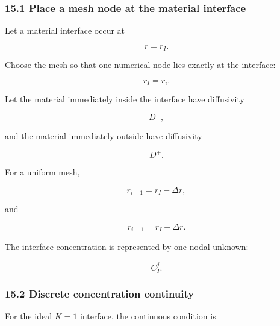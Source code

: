 \documentclass[11pt,a4paper]{article}
\begin{document}
\subsubsection*{15.1 Place a mesh node at the material interface}

Let a material interface occur at

\begin{equation}
r=r_I.
\tag{TRISO-DIS-300}
\label{eq:triso-dis-300}
\end{equation}

Choose the mesh so that one numerical node lies exactly at the interface:

\begin{equation}
r_I=r_{i}.
\tag{TRISO-DIS-301}
\label{eq:triso-dis-301}
\end{equation}

Let the material immediately inside the interface have diffusivity

\begin{equation}
D^-,
\tag{TRISO-DIS-302}
\label{eq:triso-dis-302}
\end{equation}

and the material immediately outside have diffusivity

\begin{equation}
D^+.
\tag{TRISO-DIS-303}
\label{eq:triso-dis-303}
\end{equation}

For a uniform mesh,

\begin{equation}
r_{i-1}=r_I-\Delta r,
\tag{TRISO-DIS-304}
\label{eq:triso-dis-304}
\end{equation}

and

\begin{equation}
r_{i+1}=r_I+\Delta r.
\tag{TRISO-DIS-305}
\label{eq:triso-dis-305}
\end{equation}

The interface concentration is represented by one nodal unknown:

\begin{equation}
C_I^j.
\tag{TRISO-DIS-306}
\label{eq:triso-dis-306}
\end{equation}

\subsubsection*{15.2 Discrete concentration continuity}

For the ideal $K=1$ interface, the continuous condition is
\end{document}
